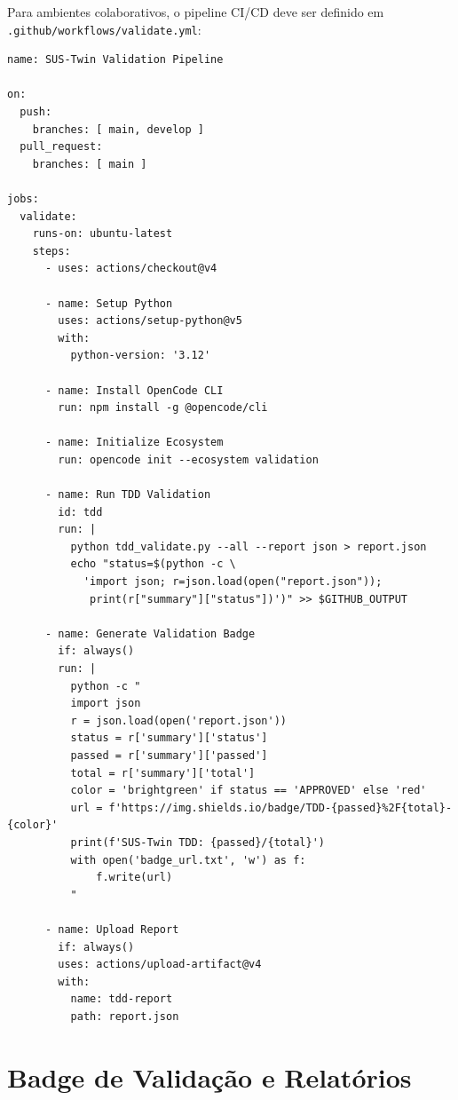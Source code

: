 Para ambientes colaborativos, o pipeline CI/CD deve ser definido em
\texttt{.github/workflows/validate.yml}:

\begin{lstlisting}[basicstyle=\ttfamily\scriptsize, caption={Workflow GitHub Actions para
validacao continua do SUS-Twin}, label={lst:github-actions}]
name: SUS-Twin Validation Pipeline

on:
  push:
    branches: [ main, develop ]
  pull_request:
    branches: [ main ]

jobs:
  validate:
    runs-on: ubuntu-latest
    steps:
      - uses: actions/checkout@v4

      - name: Setup Python
        uses: actions/setup-python@v5
        with:
          python-version: '3.12'

      - name: Install OpenCode CLI
        run: npm install -g @opencode/cli

      - name: Initialize Ecosystem
        run: opencode init --ecosystem validation

      - name: Run TDD Validation
        id: tdd
        run: |
          python tdd_validate.py --all --report json > report.json
          echo "status=$(python -c \
            'import json; r=json.load(open("report.json"));
             print(r["summary"]["status"])')" >> $GITHUB_OUTPUT

      - name: Generate Validation Badge
        if: always()
        run: |
          python -c "
          import json
          r = json.load(open('report.json'))
          status = r['summary']['status']
          passed = r['summary']['passed']
          total = r['summary']['total']
          color = 'brightgreen' if status == 'APPROVED' else 'red'
          url = f'https://img.shields.io/badge/TDD-{passed}%2F{total}-{color}'
          print(f'SUS-Twin TDD: {passed}/{total}')
          with open('badge_url.txt', 'w') as f:
              f.write(url)
          "

      - name: Upload Report
        if: always()
        uses: actions/upload-artifact@v4
        with:
          name: tdd-report
          path: report.json
\end{lstlisting}


\section{Badge de Validação e Relatórios}
\label{sec:opencode-badge}

